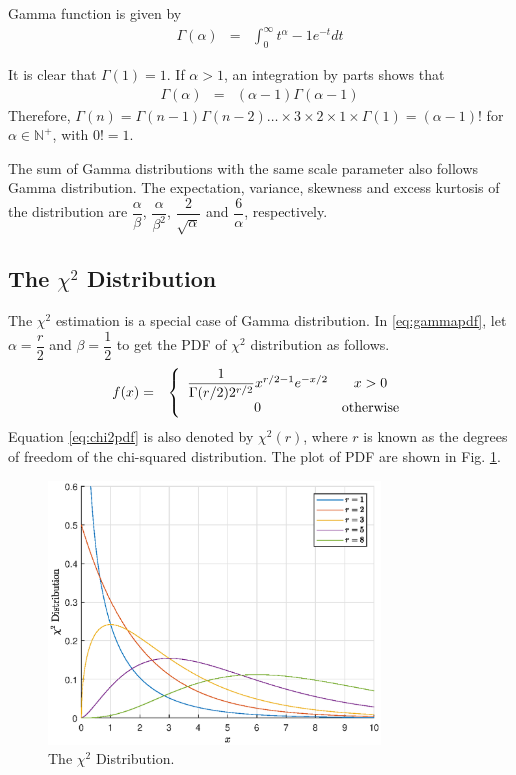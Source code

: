 \begin{shortbox}

Gamma function is given by
\begin{eqnarray}
  \Gamma(\alpha) &=& \int_{0}^{\infty}t^\alpha-1e^{-t}dt \nonumber
\end{eqnarray}

It is clear that $\Gamma(1)=1$. If $\alpha > 1$, an integration by parts shows that
\begin{eqnarray}
  \Gamma(\alpha) &=& (\alpha-1)\Gamma(\alpha-1) \nonumber
\end{eqnarray}
Therefore, $\Gamma(n)=\Gamma(n-1)\Gamma(n-2)\ldots \times 3 \times 2 \times 1 \times \Gamma(1) = (\alpha-1)!$ for $\alpha \in \mathbb{N}^+$, with $0!=1$.

\end{shortbox}

The sum of Gamma distributions with the same scale parameter also follows Gamma distribution. The expectation, variance, skewness and excess kurtosis of the distribution are $\dfrac{\alpha}{\beta}$, $\dfrac{\alpha}{\beta^2}$, $\dfrac{2}{\sqrt{\alpha}}$ and $\dfrac{6}{\alpha}$, respectively.

\subsection{The $\chi^2$ Distribution}

The $\chi^2$ estimation is a special case of Gamma distribution. In \eqref{eq:gammapdf}, let $\alpha = \dfrac{r}{2}$ and $\beta=\dfrac{1}{2}$ to get the PDF of $\chi^2$ distribution as follows.
\begin{eqnarray}
  f(x) &=& \left\{\begin{array}{cc}
                    \dfrac{1}{\Gamma(r/2)2^{r/2}}x^{r/2-1}e^{-x/2} & x > 0  \\
                    0 & \textup{otherwise}
                  \end{array}\right. \label{eq:chi2pdf}
\end{eqnarray}
Equation \eqref{eq:chi2pdf} is also denoted by $\chi^2(r)$, where $r$ is known as the degrees of freedom of the chi-squared distribution. The plot of PDF are shown in Fig. \ref{fig:chi2_pdf}.
\begin{figure}
	\centering
	\includegraphics[width=250pt]{chapters/ch-commonly-seen-distributions/figs/chi2_pdf.eps}
	\caption{The $\chi^2$ Distribution.} \label{fig:chi2_pdf}
\end{figure}

